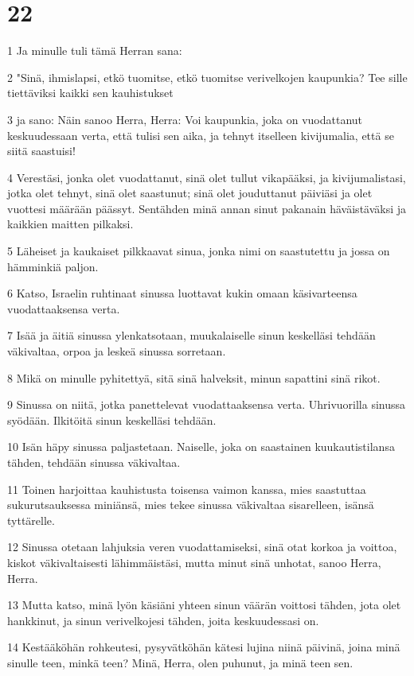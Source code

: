 \chapter{22}

\par 1 Ja minulle tuli tämä Herran sana:
\par 2 "Sinä, ihmislapsi, etkö tuomitse, etkö tuomitse verivelkojen kaupunkia? Tee sille tiettäviksi kaikki sen kauhistukset
\par 3 ja sano: Näin sanoo Herra, Herra: Voi kaupunkia, joka on vuodattanut keskuudessaan verta, että tulisi sen aika, ja tehnyt itselleen kivijumalia, että se siitä saastuisi!
\par 4 Verestäsi, jonka olet vuodattanut, sinä olet tullut vikapääksi, ja kivijumalistasi, jotka olet tehnyt, sinä olet saastunut; sinä olet jouduttanut päiviäsi ja olet vuottesi määrään päässyt. Sentähden minä annan sinut pakanain häväistäväksi ja kaikkien maitten pilkaksi.
\par 5 Läheiset ja kaukaiset pilkkaavat sinua, jonka nimi on saastutettu ja jossa on hämminkiä paljon.
\par 6 Katso, Israelin ruhtinaat sinussa luottavat kukin omaan käsivarteensa vuodattaaksensa verta.
\par 7 Isää ja äitiä sinussa ylenkatsotaan, muukalaiselle sinun keskelläsi tehdään väkivaltaa, orpoa ja leskeä sinussa sorretaan.
\par 8 Mikä on minulle pyhitettyä, sitä sinä halveksit, minun sapattini sinä rikot.
\par 9 Sinussa on niitä, jotka panettelevat vuodattaaksensa verta. Uhrivuorilla sinussa syödään. Ilkitöitä sinun keskelläsi tehdään.
\par 10 Isän häpy sinussa paljastetaan. Naiselle, joka on saastainen kuukautistilansa tähden, tehdään sinussa väkivaltaa.
\par 11 Toinen harjoittaa kauhistusta toisensa vaimon kanssa, mies saastuttaa sukurutsauksessa miniänsä, mies tekee sinussa väkivaltaa sisarelleen, isänsä tyttärelle.
\par 12 Sinussa otetaan lahjuksia veren vuodattamiseksi, sinä otat korkoa ja voittoa, kiskot väkivaltaisesti lähimmäistäsi, mutta minut sinä unhotat, sanoo Herra, Herra.
\par 13 Mutta katso, minä lyön käsiäni yhteen sinun väärän voittosi tähden, jota olet hankkinut, ja sinun verivelkojesi tähden, joita keskuudessasi on.
\par 14 Kestääköhän rohkeutesi, pysyvätköhän kätesi lujina niinä päivinä, joina minä sinulle teen, minkä teen? Minä, Herra, olen puhunut, ja minä teen sen.

